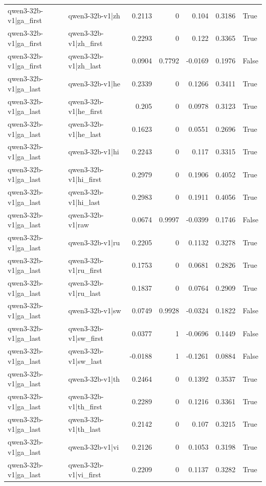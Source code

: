 \begin{table}
\begin{tabular}{l l r r r r l}
qwen3-32b-v1|ga_first & qwen3-32b-v1|zh & 0.2113 & 0 & 0.104 & 0.3186 & True \\
qwen3-32b-v1|ga_first & qwen3-32b-v1|zh_first & 0.2293 & 0 & 0.122 & 0.3365 & True \\
qwen3-32b-v1|ga_first & qwen3-32b-v1|zh_last & 0.0904 & 0.7792 & -0.0169 & 0.1976 & False \\
qwen3-32b-v1|ga_last & qwen3-32b-v1|he & 0.2339 & 0 & 0.1266 & 0.3411 & True \\
qwen3-32b-v1|ga_last & qwen3-32b-v1|he_first & 0.205 & 0 & 0.0978 & 0.3123 & True \\
qwen3-32b-v1|ga_last & qwen3-32b-v1|he_last & 0.1623 & 0 & 0.0551 & 0.2696 & True \\
qwen3-32b-v1|ga_last & qwen3-32b-v1|hi & 0.2243 & 0 & 0.117 & 0.3315 & True \\
qwen3-32b-v1|ga_last & qwen3-32b-v1|hi_first & 0.2979 & 0 & 0.1906 & 0.4052 & True \\
qwen3-32b-v1|ga_last & qwen3-32b-v1|hi_last & 0.2983 & 0 & 0.1911 & 0.4056 & True \\
qwen3-32b-v1|ga_last & qwen3-32b-v1|raw & 0.0674 & 0.9997 & -0.0399 & 0.1746 & False \\
qwen3-32b-v1|ga_last & qwen3-32b-v1|ru & 0.2205 & 0 & 0.1132 & 0.3278 & True \\
qwen3-32b-v1|ga_last & qwen3-32b-v1|ru_first & 0.1753 & 0 & 0.0681 & 0.2826 & True \\
qwen3-32b-v1|ga_last & qwen3-32b-v1|ru_last & 0.1837 & 0 & 0.0764 & 0.2909 & True \\
qwen3-32b-v1|ga_last & qwen3-32b-v1|sw & 0.0749 & 0.9928 & -0.0324 & 0.1822 & False \\
qwen3-32b-v1|ga_last & qwen3-32b-v1|sw_first & 0.0377 & 1 & -0.0696 & 0.1449 & False \\
qwen3-32b-v1|ga_last & qwen3-32b-v1|sw_last & -0.0188 & 1 & -0.1261 & 0.0884 & False \\
qwen3-32b-v1|ga_last & qwen3-32b-v1|th & 0.2464 & 0 & 0.1392 & 0.3537 & True \\
qwen3-32b-v1|ga_last & qwen3-32b-v1|th_first & 0.2289 & 0 & 0.1216 & 0.3361 & True \\
qwen3-32b-v1|ga_last & qwen3-32b-v1|th_last & 0.2142 & 0 & 0.107 & 0.3215 & True \\
qwen3-32b-v1|ga_last & qwen3-32b-v1|vi & 0.2126 & 0 & 0.1053 & 0.3198 & True \\
qwen3-32b-v1|ga_last & qwen3-32b-v1|vi_first & 0.2209 & 0 & 0.1137 & 0.3282 & True \\

\end{tabular}
\end{table}

